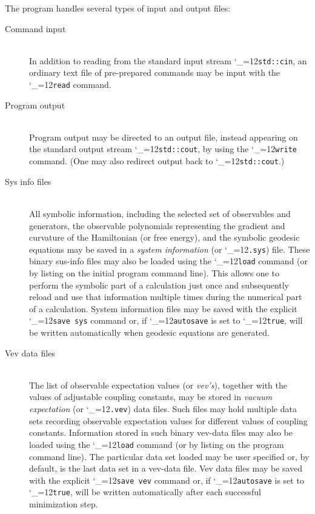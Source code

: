 \documentclass [12pt]{article}
\makeatletter
\renewcommand{\tt}{\begingroup\catcode`_=12\def\_{\string_}\tt@}
\newcommand{\tt@}[1]{\texttt{#1}\endgroup}
\makeatother
\begin{document}
The program handles several types of input and output files:
\begin{description}
\item [Command input]~\\
    In addition to reading from the standard input stream \tt{std::cin},
    an ordinary text file of pre-prepared commands may be 
    input with the \tt{read} command.

\item [Program output]~\\
    Program output may be directed to an output file,
    instead appearing on the standard output stream \tt{std::cout},
    by using the \tt{write} command.
    (One may also redirect output back to \tt{std::cout}.)

\item [Sys info files]~\\
    All symbolic information, including the selected
    set of observables and generators, the observable
    polynomials representing the
    gradient and curvature of the Hamiltonian (or free energy),
    and the symbolic geodesic equations may be saved
    in a \textit{system information} (or \tt{.sys}) file.
    These binary sus-info files may also be
    loaded using the \tt{load} command (or by listing
    on the initial program command line).
    This allows one to perform the symbolic part of a calculation
    just once and subsequently reload and use that information
    multiple times during the numerical part of a calculation.
    System information files may be saved with the explicit
    \tt{save sys} command or, if \tt{autosave} is set to \tt{true},
    will be written automatically when geodesic equations are generated.

\item [Vev data files]~\\
    The list of observable expectation values (or \textit{vev's}),
    together with the values of adjustable coupling constants,
    may be stored in \textit{vacuum expectation} (or \tt{.vev}) data files.
    Such files may hold multiple data sets recording observable
    expectation values for different values of coupling constants.
    Information stored in such binary vev-data files may
    also be loaded
    using the \tt{load} command
    (or by listing on the program command line).
    The particular data set loaded may be user specified or, by default,
    is the last data set in a vev-data file.
    Vev data files may be saved with the explicit \tt{save vev}
    command or, if \tt{autosave} is set to \tt{true},
    will be written automatically after each successful minimization step.


\end{description}
\end{document}
